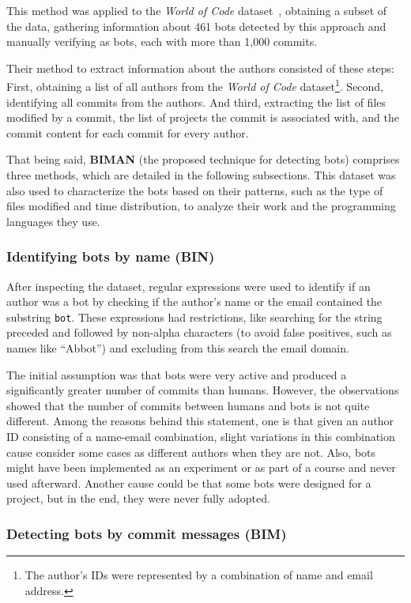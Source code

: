 \documentclass[a4paper, 12pt]{book}
\begin{document}
This method was applied to the \emph{World of Code} dataset~\cite{mockus-woc}, obtaining a subset of the data, gathering information about 461 bots detected by this approach and manually verifying as bots, each with more than 1,000 commits.

Their method to extract information about the authors consisted of these steps: First, obtaining a list of all authors from the \emph{World of Code} dataset\footnote{The author's IDs were represented by a combination of name and email address.}. 
Second, identifying all commits from the authors. And third, extracting the list of files modified by a commit, the list of projects the commit is associated with, and the commit content for each commit for every author.

That being said, \textbf{BIMAN} (the proposed technique for detecting bots) comprises three methods, which are detailed in the following subsections. This dataset was also used to characterize the bots based on their patterns, such as the type of files modified and time distribution, to analyze their work and the programming languages they use.

\subsubsection{Identifying bots by name (BIN)}
\label{sssec:dey-bin}

After inspecting the dataset, regular expressions were used to identify if an author was a bot by checking if the author's name or the email contained the substring \texttt{bot}. These expressions had restrictions, like searching for the string preceded and followed by non-alpha characters (to avoid false positives, such as names like ``Abbot'') and excluding from this search the email domain.

The initial assumption was that bots were very active and produced a significantly greater number of commits than humans. However, the observations showed that the number of commits between humans and bots is not quite different. Among the reasons behind this statement, one is that given an author ID consisting of a name-email combination, slight variations in this combination cause consider some cases as different authors when they are not. Also, bots might have been implemented as an experiment or as part of a course and never used afterward. Another cause could be that some bots were designed for a project, but in the end, they were never fully adopted.

\subsubsection{Detecting bots by commit messages (BIM)}
\label{sssec:dey-bim}
\end{document}
